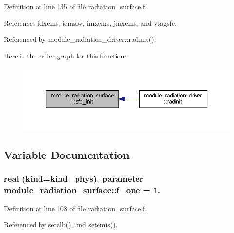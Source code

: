 Definition at line 135 of file radiation\+\_\+surface.\+f.



References idxems, iemslw, imxems, jmxems, and vtagsfc.



Referenced by module\+\_\+radiation\+\_\+driver\+::radinit().



Here is the caller graph for this function\+:
\nopagebreak
\begin{figure}[H]
\begin{center}
\leavevmode
\includegraphics[width=350pt]{group__module__radiation__surface_gaeb08607a27653edcaca756366feff0c0_icgraph}
\end{center}
\end{figure}




\subsection{Variable Documentation}
\subsubsection[{\texorpdfstring{f\+\_\+one}{f_one}}]{\setlength{\rightskip}{0pt plus 5cm}real (kind=kind\+\_\+phys), parameter module\+\_\+radiation\+\_\+surface\+::f\+\_\+one = 1.\hspace{0.3cm}{\ttfamily [private]}}\hypertarget{group__module__radiation__surface_ga91cec823f595387c92d659d89f307f42}{}\label{group__module__radiation__surface_ga91cec823f595387c92d659d89f307f42}


Definition at line 108 of file radiation\+\_\+surface.\+f.



Referenced by setalb(), and setemis().

